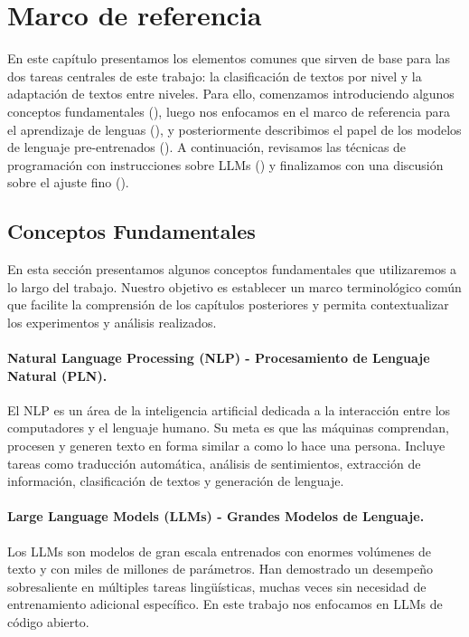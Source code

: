 \section{Marco de referencia} \label{sec:marco_ref}
En este capítulo presentamos los elementos comunes que sirven de base para las dos tareas centrales de este trabajo: la clasificación de textos por nivel y la adaptación de textos entre niveles. Para ello, comenzamos introduciendo algunos conceptos fundamentales (), luego nos enfocamos en el marco de referencia para el aprendizaje de lenguas (), y posteriormente describimos el papel de los modelos de lenguaje pre-entrenados (). A continuación, revisamos las técnicas de programación con instrucciones sobre LLMs () y finalizamos con una discusión sobre el ajuste fino ().

\subsection{Conceptos Fundamentales}\label{subsec:concep_fund}
En esta sección presentamos algunos conceptos fundamentales que utilizaremos a lo largo del trabajo. Nuestro objetivo es establecer un marco terminológico común que facilite la comprensión de los capítulos posteriores y permita contextualizar los experimentos y análisis realizados.

\paragraph{Natural Language Processing (NLP) - Procesamiento de Lenguaje Natural (PLN).\parencite{nlp}}
El NLP es un área de la inteligencia artificial dedicada a la interacción entre los computadores y el lenguaje humano. Su meta es que las máquinas comprendan, procesen y generen texto en forma similar a como lo hace una persona. Incluye tareas como traducción automática, análisis de sentimientos, extracción de información, clasificación de textos y generación de lenguaje.

\paragraph{Large Language Models (LLMs) - Grandes Modelos de Lenguaje.\parencite{llms}}
Los LLMs son modelos de gran escala entrenados con enormes volúmenes de texto y con miles de millones de parámetros. Han demostrado un desempeño sobresaliente en múltiples tareas lingüísticas, muchas veces sin necesidad de entrenamiento adicional específico. En este trabajo nos enfocamos en LLMs de código abierto.

